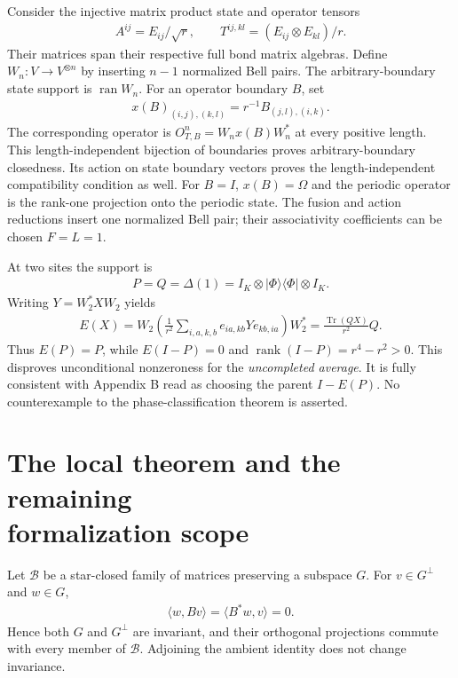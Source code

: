 \documentclass{article}
\begin{document}
Consider the injective matrix product state and operator tensors
\begin{align}
    A^{ij}=E_{ij}/\sqrt r,\qquad
    T^{ij,kl}=(E_{ij}\otimes E_{kl})/r.
    \label{eq:glm23_wha_parent_tensors}
\end{align}
Their matrices span their respective full bond matrix algebras. Define
$W_n:V\to V^{\otimes n}$ by inserting $n-1$ normalized Bell pairs.
The arbitrary-boundary state support is $\operatorname{ran}W_n$.
For an operator boundary $B$, set
\begin{align}
    x(B)_{(i,j),(k,l)}=r^{-1}B_{(j,l),(i,k)}.
    \label{eq:glm23_wha_parent_boundary_map}
\end{align}
The corresponding operator is $O^n_{T,B}=W_nx(B)W_n^*$ at every positive
length. This length-independent bijection of boundaries proves
arbitrary-boundary closedness. Its action on state boundary vectors
proves the length-independent compatibility condition as well.
For $B=I$, $x(B)=\Omega$ and the periodic operator is the rank-one
projection onto the periodic state. The fusion and action reductions
insert one normalized Bell pair; their associativity coefficients can
be chosen $F=L=1$.

At two sites the support is
\begin{align}
    P=Q=\Delta(1)=I_K\otimes|\Phi\rangle\langle\Phi|\otimes I_K.
    \label{eq:glm23_wha_parent_two_site_support}
\end{align}
Writing $Y=W_2^*XW_2$ yields
\begin{align}
    E(X)=W_2\left(\frac1{r^2}\sum_{i,a,k,b}
    e_{ia,kb}Y e_{kb,ia}\right)W_2^*
    =\frac{\operatorname{Tr}(QX)}{r^2}Q.
    \label{eq:glm23_wha_parent_two_site_average}
\end{align}
Thus $E(P)=P$, while $E(I-P)=0$ and
$\operatorname{rank}(I-P)=r^4-r^2>0$. This disproves unconditional
nonzeroness for the \emph{uncompleted average}. It is fully consistent
with Appendix B read as choosing the parent $I-E(P)$. No counterexample
to the phase-classification theorem is asserted.

\section[The local theorem and the remaining formalization scope]
 {The local theorem and the remaining\\formalization scope}
Let $\mathcal B$ be a star-closed family of matrices preserving a
subspace $G$. For $v\in G^\perp$ and $w\in G$,
\begin{align}
    \langle w,Bv\rangle=\langle B^*w,v\rangle=0.
    \label{eq:glm23_wha_parent_orthogonal_reduction}
\end{align}
Hence both $G$ and $G^\perp$ are invariant, and their orthogonal
projections commute with every member of $\mathcal B$. Adjoining the
ambient identity does not change invariance.
\end{document}
